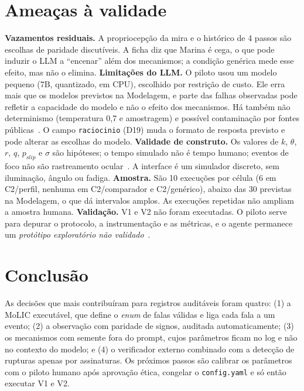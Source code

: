 \documentclass[conference]{IEEEtran}
\begin{document}
\section{Ameaças à validade}
\textbf{Vazamentos residuais.} A propriocepção da mira e o histórico de 4 passos são escolhas de paridade discutíveis. A ficha diz que Marina é cega, o que pode induzir o LLM a ``encenar'' além dos mecanismos; a condição genérica mede esse efeito, mas não o elimina.
\textbf{Limitações do LLM.} O piloto usou um modelo pequeno (7B, quantizado, em CPU), escolhido por restrição de custo. Ele erra mais que os modelos previstos na Modelagem, e parte das falhas observadas pode refletir a capacidade do modelo e não o efeito dos mecanismos. Há também não determinismo (temperatura 0{,}7 e amostragem) e possível contaminação por fontes públicas~\cite{manduchi}. O campo \texttt{raciocinio} (D19) muda o formato de resposta previsto e pode alterar as escolhas do modelo.
\textbf{Validade de construto.} Os valores de $k$, $\theta$, $r$, $q$, $p_{slip}$ e $\sigma$ são hipóteses; o tempo simulado não é tempo humano; eventos de foco não são rastreamento ocular~\cite{nielsen}. A interface é um simulador discreto, sem iluminação, ângulo ou fadiga.
\textbf{Amostra.} São 10 execuções por célula (6 em C2/perfil, nenhuma em C2/comparador e C2/genérico), abaixo das 30 previstas na Modelagem, o que dá intervalos amplos. As execuções repetidas não ampliam a amostra humana.
\textbf{Validação.} V1 e V2 não foram executadas. O piloto serve para depurar o protocolo, a instrumentação e as métricas, e o agente permanece um \emph{protótipo exploratório não validado}~\cite{modelagem}.

\section{Conclusão}
As decisões que mais contribuíram para registros auditáveis foram quatro: (1) a MoLIC executável, que define o \emph{enum} de falas válidas e liga cada fala a um evento; (2) a observação com paridade de signos, auditada automaticamente; (3) os mecanismos com semente fora do prompt, cujos parâmetros ficam no log e não no contexto do modelo; e (4) o verificador externo combinado com a detecção de rupturas apenas por assinaturas. Os próximos passos são calibrar os parâmetros com o piloto humano após aprovação ética, congelar o \texttt{config.yaml} e só então executar V1 e V2.
\end{document}
